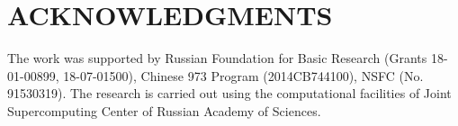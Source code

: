 \documentclass{aip-cp}
\begin{document}
\section{ACKNOWLEDGMENTS}
The work was supported by Russian Foundation for Basic Research (Grants 18-01-00899, 18-07-01500),
Chinese 973 Program (2014CB744100), NSFC (No. 91530319).
The research is carried out using the computational facilities of Joint Supercomputing Center of Russian Academy of Sciences.


%
%
\end{document}
